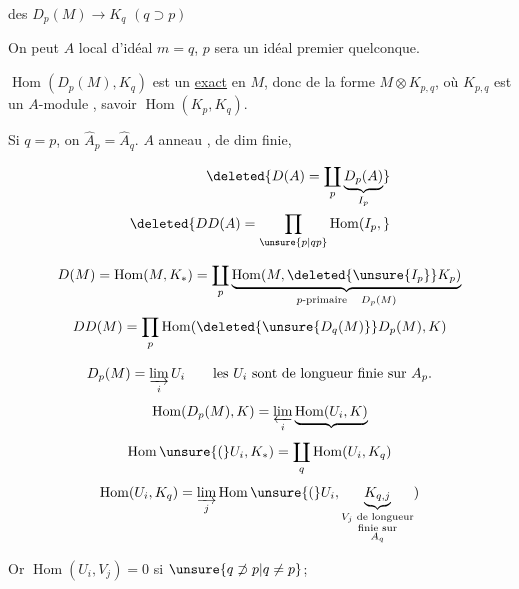  des  $D_p(M)\longrightarrow K_q$ $(q\supset p)$

On peut  $A$ local d'idéal  $m=q$, $p$ sera un idéal premier quelconque.

 $\operatorname{Hom}(D_p(M),K_q)$ est un  \uline{exact} en $M$, donc de la forme $M\otimes K_{p,q}$, où $K_{p,q}$ est un $A$-module  , savoir $\operatorname{Hom}(K_p,K_q)$.

Si $q=p$, on  $\widehat A_p=\widehat A_q$.
$A$ anneau , de dim finie, 

\[
\begin{aligned}
\deleted{D(A)=\coprod_p\underbrace{D_p(A)}_{I_p}}\\
\deleted{DD(A)=\prod_{\unsure{p|qp}}\operatorname{Hom}(I_p,}
\end{aligned}
\]

\[
D(M)=\operatorname{Hom}(M,K_*)=\coprod_p
\underbrace{\operatorname{Hom}(M,\deleted{\unsure{I_p}}K_p)}_{p\text{-primaire}\quad D_p(M)}
\]
\[
DD(M)=\prod_p\operatorname{Hom}(\deleted{\unsure{D_q(M)}}D_p(M),K)
\]

\[
D_p(M)=\varinjlim_i U_i
\qquad\text{les $U_i$ sont de longueur finie sur $A_p$.}
\]
\[
\operatorname{Hom}(D_p(M),K)=\varprojlim_i\underbrace{\operatorname{Hom}(U_i,K)}
\]
\[
\operatorname{Hom}\unsure{(}U_i,K_*)=\coprod_q\operatorname{Hom}(U_i,K_q)
\]
\[
\operatorname{Hom}(U_i,K_q)=\varinjlim_j\operatorname{Hom}\unsure{(}U_i,
\underbrace{K_{q,j}}_{\substack{V_j\text{ de longueur}\\\text{finie sur}\\A_q}})
\]


Or $\operatorname{Hom}(U_i,V_j)=0$ si $\unsure{q\not\supset p|q\ne p}$;

